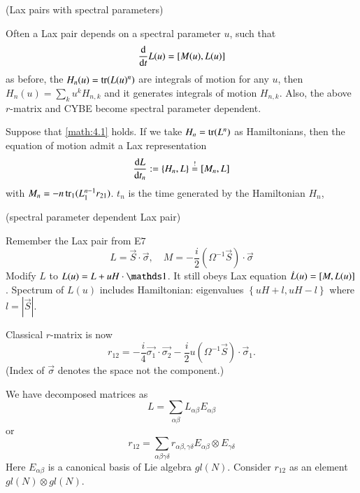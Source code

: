 \begin{example} (Lax pairs with spectral parameters)

Often a Lax pair depends on a spectral parameter $u$, such that 
\begin{equation}
	\dv{t} L(u) = \comm{M(u)}{L(u)}
	\label{math:4.4}
\end{equation}
as before, the $H_n(u) = \tr(L(u)^n)$ are integrals of motion for any $u$, then $H_n(u) = \sum_{k} u^k H_{n, k}$ and it generates integrals of motion $H_{n, k}$.  Also, the above $r$-matrix and CYBE become spectral parameter dependent.
\end{example}

\begin{prop}
	Suppose that \eqref{math:4.1} holds. If we take $H_n = \tr(L^n)$ as Hamiltonians, then the equation of motion admit a Lax representation
	\begin{equation*}
		\dv{L}{t_n} := \pb{H_n}{L} \stackrel{!}{=} \comm{M_n}{L}
	\end{equation*}
	with $M_n = - n \tr_1 (L_1^{n-1} r_{21})$. $t_n$ is the time generated by the Hamiltonian $H_n$,
\end{prop}

\begin{example}  (spectral parameter dependent Lax pair)

Remember the Lax pair from E$7$
\begin{equation*}
	L = \vec{S} \cdot \vec{\sigma},\quad M = - \frac{i}{2} (\Omega^{-1} \vec{S}) \cdot \vec{\sigma}
\end{equation*}
Modify $L$ to $L(u) = L + u H \cdot \id$. It still obeys Lax equation $\dot{L}(u) = \comm{M}{L(u)}$. Spectrum of $L(u)$ includes Hamiltonian: eigenvalues $\left\{ uH + l, uH-l \right\} $ where $l = |\vec{S}|$. 

Classical $r$-matrix is now
\begin{equation*}
	r_{12} = - \frac{i}{4} \vec{\sigma_1} \cdot \vec{\sigma_2} - \frac{i}{2} u (\Omega^{-1} \vec{S}) \cdot \vec{\sigma}_1.
\end{equation*}
(Index of $\vec{\sigma}$ denotes the space not the component.)
\end{example}

We have decomposed matrices as 
\begin{equation*}
	L = \sum_{\alpha \beta} L_{\alpha \beta} E_{\alpha \beta}
\end{equation*}
or 
\begin{equation*}
	r_{12} = \sum_{\alpha \beta \gamma \delta} r_{\alpha \beta, \gamma \delta} E_{\alpha \beta} \otimes E_{\gamma \delta}
\end{equation*}
Here $E_{\alpha \beta}$ is a canonical basis of Lie algebra $gl(N)$. Consider $r_{12}$ as an element $gl(N) \otimes gl(N)$.

